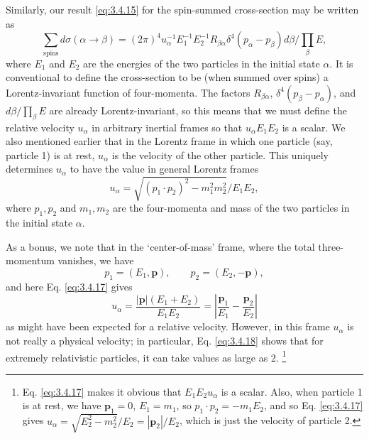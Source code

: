 Similarly, our result \eqref{eq:3.4.15} for the spin-summed cross-section may be written as
\[
 \sum_{\mathrm{spins}}d\sigma(\alpha\to\beta)
 =(2\pi)^4u_\alpha^{-1}E_1^{-1}E_2^{-1}R_{\beta\alpha}
 \delta^4(p_\alpha-p_\beta)d\beta/\prod_\beta E,
\]
where $E_1$ and $E_2$ are the energies of the two particles in the initial state $\alpha$.
It is conventional to define the cross-section to be (when summed over spins) a Lorentz-invariant
function of four-momenta. The factors $R_{\beta\alpha}$, $\delta^4(p_\beta-p_\alpha)$, and
$d\beta/\prod_\beta E$ are already Lorentz-invariant, so this means that we must define the
relative velocity $u_\alpha$ in arbitrary inertial frames so that $u_\alpha E_1E_2$ is a scalar.
We also mentioned earlier that in the Lorentz frame in which one particle (say, particle 1) is
at rest, $u_\alpha$ is the velocity of the other particle. This uniquely determines $u_\alpha$
to have the value in general Lorentz frames
\begin{equation}
 u_\alpha=\sqrt{(p_1\cdot p_2)^2-m_1^2m_2^2}\big/E_1E_2,
 \tag{3.4.17}\label{eq:3.4.17}
\end{equation}
where $p_1,p_2$ and $m_1,m_2$ are the four-momenta and mass of the two particles in the initial
state $\alpha$.

As a bonus, we note that in the `center-of-mass' frame, where the total three-momentum vanishes,
we have
\[
 p_1=(E_1,\mathbf{p}),\qquad p_2=(E_2,-\mathbf{p}),
\]
and here Eq. \eqref{eq:3.4.17} gives
\begin{equation}
 u_\alpha=\frac{|\mathbf{p}|(E_1+E_2)}{E_1E_2}
 =\left|\frac{\mathbf{p}_1}{E_1}-\frac{\mathbf{p}_2}{E_2}\right|
 \tag{3.4.18}\label{eq:3.4.18}
\end{equation}
as might have been expected for a relative velocity. However, in this frame $u_\alpha$ is not
really a physical velocity; in particular, Eq. \eqref{eq:3.4.18} shows that for extremely relativistic
particles, it can take values as large as 2.
\footnote{Eq. \eqref{eq:3.4.17} makes it obvious that $E_1E_2u_\alpha$ is a scalar. Also, when particle 1
is at rest, we have $\mathbf{p}_1=0$, $E_1=m_1$, so $p_1\cdot p_2=-m_1E_2$, and so Eq. \eqref{eq:3.4.17}
gives $u_\alpha=\sqrt{E_2^2-m_2^2}/E_2=|\mathbf{p}_2|/E_2$, which is just the velocity of
particle 2.}

